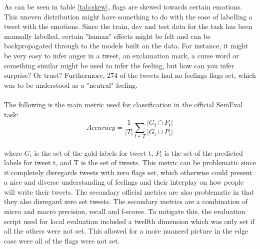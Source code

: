 As can be seen in table \ref{tab:skew}, flags are skewed towards certain emotions. This uneven distribution might have something to do with the ease of labelling a tweet with the emotions. Since the train, dev and test data for the task has been manually labelled, certain "human" effects might be felt and can be backpropagated through to the models built on the data. For instance, it might be very easy to infer anger in a tweet, an exclamation mark, a curse word or something similar might be used to infer the feeling, but how can you infer surprise? Or trust? Furthermore, 274 of the tweets had no feelings flags set, which was to be understood as a "neutral" feeling.\\
\\
The following is the main metric used for classification in the official SemEval task:\\
\begin{equation} \label{eq:accuracy}
Accuracy = \dfrac{1}{\lvert T \rvert} \sum_{t\in T}\dfrac{\lvert G_{t} \cap P_{t}\rvert}{\lvert G_{t} \cup P_{t}\rvert}
\end{equation}\\
where $G_{t}$ is the set of the gold labels for tweet t, $P_{t}$ is the set of the predicted labels for tweet t, and T is the set of tweets. This metric can be problematic since it completely disregards tweets with zero flags set, which otherwise could present a nice and diverse understanding of feelings and their interplay on how people will write their tweets. The secondary official metrics are also problematic in that they also disregard zero set tweets. The secondary metrics are a combination of micro and macro precision, recall and f-scores. To mitigate this, the evaluation script used for local evaluation included a twelfth dimension which was only set if all the others were not set. This allowed for a more nuanced picture in the edge case were all of the flags were not set.